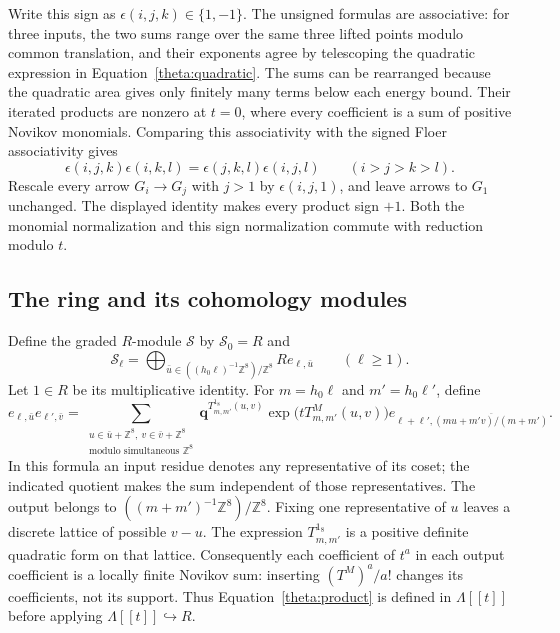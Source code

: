 \documentclass[11pt]{article}
\theoremstyle{definition}
\theoremstyle{remark}
\newcommand{\Z}{\mathbb Z}
\newcommand{\qnov}{\mathbf q}
\numberwithin{equation}{section}
\begin{document}
Write this sign as $\epsilon(i,j,k)\in\{1,-1\}$.  The unsigned formulas
are associative: for three inputs, the two sums range over the same
three lifted points modulo common translation, and their exponents agree
by telescoping the quadratic expression in
Equation~\eqref{theta:quadratic}.  The sums can be rearranged because the
quadratic area gives only finitely many terms below each energy bound.
Their iterated products are nonzero at $t=0$, where every coefficient is
a sum of positive Novikov monomials.  Comparing this associativity with
the signed Floer associativity gives
\[
 \epsilon(i,j,k)\epsilon(i,k,l)
   =\epsilon(j,k,l)\epsilon(i,j,l)\qquad(i>j>k>l).
\]
Rescale every arrow $G_i\to G_j$ with $j>1$ by
$\epsilon(i,j,1)$, and leave arrows to $G_1$ unchanged.  The displayed
identity makes every product sign $+1$.  Both the monomial normalization
and this sign normalization commute with reduction modulo $t$.

\subsection{The ring and its cohomology modules}

Define the graded $R$-module $\mathscr S$ by $\mathscr S_0=R$ and
\[
 \mathscr S_\ell=
 \bigoplus_{\bar u\in ((h_0\ell)^{-1}\Z^8)/\Z^8}
       R e_{\ell,\bar u}\qquad(\ell\geq1).
\]
Let $1\in R$ be its multiplicative identity.  For
$m=h_0\ell$ and $m'=h_0\ell'$, define
\begin{equation}\label{theta:product}
 e_{\ell,\bar u}e_{\ell',\bar v}
 =\sum_{\substack{u\in\bar u+\Z^8,\ v\in\bar v+\Z^8\\
                         \text{modulo simultaneous }\Z^8}}
  \qnov^{T^{1_8}_{m,m'}(u,v)}
  \exp\bigl(tT^M_{m,m'}(u,v)\bigr)
  e_{\ell+\ell',\overline{(mu+m'v)/(m+m')}}.
\end{equation}
In this formula an input residue denotes any representative of its coset;
the indicated quotient makes the sum independent of those representatives.
The output belongs to $((m+m')^{-1}\Z^8)/\Z^8$.
Fixing one representative of $u$ leaves a discrete lattice of possible
$v-u$.  The expression $T^{1_8}_{m,m'}$ is a positive definite quadratic
form on that lattice.  Consequently each coefficient of $t^a$ in each
output coefficient is a locally finite Novikov sum: inserting
$(T^M)^a/a!$ changes its coefficients, not its support.  Thus
Equation~\eqref{theta:product} is defined in $\Lambda[[t]]$ before applying
$\Lambda[[t]]\hookrightarrow R$.
\end{document}

